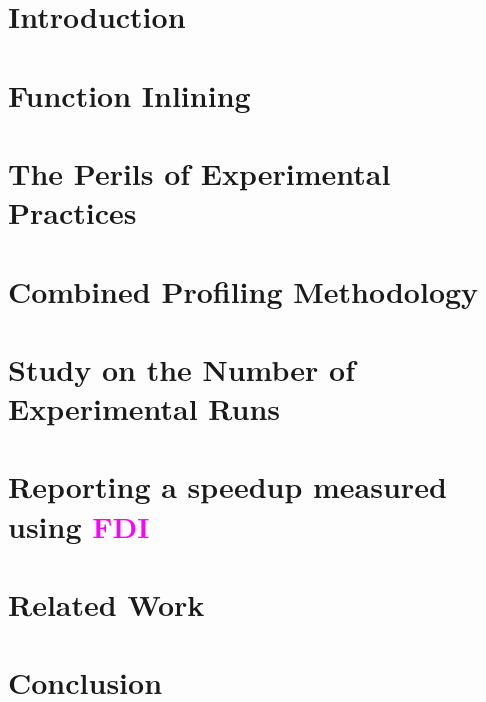 \documentclass[conference]{IEEEtran}
\renewcommand{\ifColorText}[2]{\textcolor{#1}{#2}}  %
\def\FDI{{\ifColorText{Magenta}{FDI}}}
\begin{document}
\section{Introduction}
	\label{sec:intro}
	

\section{Function Inlining}
	\label{sec:inlining}
	

\section{The Perils of Experimental Practices}
	\label{sec:description}
	

\section{Combined Profiling Methodology}
	\label{sec:cmbprof}
	
	
\section{Study on the Number of Experimental Runs}
	\label{sec:robust}
	
	
\section{Reporting a speedup measured using \FDI\ }
	\label{sec:speedup}
	





\section{Related Work}
	\label{sec:related}
	

\section{Conclusion}
	\label{sec:conclusion}
	

%	

%


\end{document}

